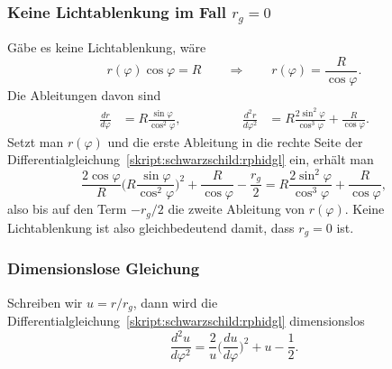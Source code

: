 \subsubsection{Keine Lichtablenkung im Fall $r_g=0$}
Gäbe es keine Lichtablenkung, wäre 
\[
r(\varphi)\cos\varphi = R
\qquad\Rightarrow\qquad
r(\varphi)=\frac{R}{\cos\varphi}.
\]
Die Ableitungen davon sind
\begin{equation}
\begin{aligned}
\frac{dr}{d\varphi}
&=
R\frac{\sin \varphi}{\cos ^2\varphi},
\qquad
&
\qquad
\frac{d^2r}{d\varphi^2}
&=
R
\frac{2\sin ^2\varphi}{\cos ^3\varphi}+\frac{R}{\cos \varphi}.
\end{aligned}
\end{equation}
Setzt man $r(\varphi)$ und die erste Ableitung in die rechte Seite der
Differentialgleichung~\eqref{skript:schwarzschild:rphidgl}
ein, erhält man
\[
\frac{2\cos\varphi}{R}\biggl(
R\frac{\sin\varphi}{\cos^2\varphi}
\biggr)^2
+\frac{R}{\cos\varphi}
-\frac{r_g}2
=
R\frac{2\sin^2\varphi}{\cos^3\varphi}+\frac{R}{\cos\varphi},
\]
also bis auf den Term $-r_g/2$ die zweite Ableitung von $r(\varphi)$.
Keine Lichtablenkung ist also gleichbedeutend damit, dass $r_g=0$ ist.

\subsubsection{Dimensionslose Gleichung}
Schreiben wir $u=r/r_g$, dann wird die
Differentialgleichung~\eqref{skript:schwarzschild:rphidgl}
dimensionslos
\begin{equation}
\frac{d^2u}{d\varphi^2}
=
\frac{2}{u}
\biggl(\frac{du}{d\varphi}\biggr)^2+u-\frac12.
\label{skript:schwarzschild:udgl}
\end{equation}

